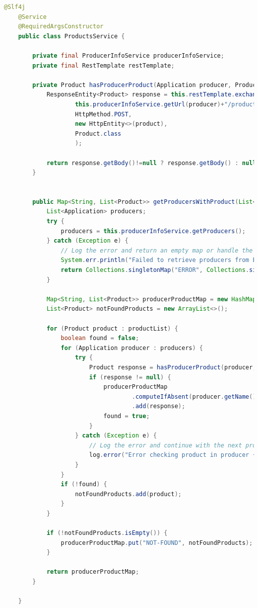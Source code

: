 \begin{lstlisting}[language=Java,caption= Kod klasy ProductsService, label=productsServiceCode]    
    @Slf4j
    @Service
    @RequiredArgsConstructor
    public class ProductsService {
    
        private final ProducerInfoService producerInfoService;
        private final RestTemplate restTemplate;
    
        private Product hasProducerProduct(Application producer, Product product){
            ResponseEntity<Product> response = this.restTemplate.exchange(
                    this.producerInfoService.getUrl(producer)+"/products/check",
                    HttpMethod.POST,
                    new HttpEntity<>(product),
                    Product.class
                    );
    
            return response.getBody()!=null ? response.getBody() : null;
        }
    
    
        public Map<String, List<Product>> getProducersWithProduct(List<Product> productList) {
            List<Application> producers;
            try {
                producers = this.producerInfoService.getProducers();
            } catch (Exception e) {
                // Log the error and return an empty map or handle the error as needed
                System.err.println("Failed to retrieve producers from Eureka: " + e.getMessage());
                return Collections.singletonMap("ERROR", Collections.singletonList(new Product()));
            }
    
            Map<String, List<Product>> producerProductMap = new HashMap<>();
            List<Product> notFoundProducts = new ArrayList<>();
    
            for (Product product : productList) {
                boolean found = false;
                for (Application producer : producers) {
                    try {
                        Product response = hasProducerProduct(producer, product);
                        if (response != null) {
                            producerProductMap
                                    .computeIfAbsent(producer.getName(), k -> new ArrayList<>())
                                    .add(response);
                            found = true;
                        }
                    } catch (Exception e) {
                        // Log the error and continue with the next producer
                        log.error("Error checking product in producer {}: {}", producer.getName(), e.getMessage());
                    }
                }
                if (!found) {
                    notFoundProducts.add(product);
                }
            }
    
            if (!notFoundProducts.isEmpty()) {
                producerProductMap.put("NOT-FOUND", notFoundProducts);
            }
    
            return producerProductMap;
        }
    
    }

\end{lstlisting}

